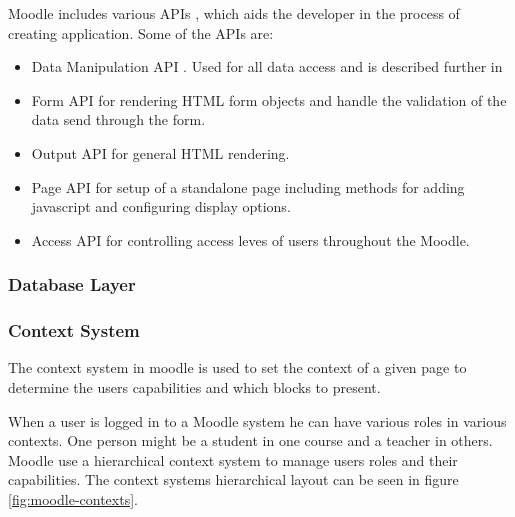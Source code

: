  Moodle includes various APIs \cite{moodlecoreapis}, which aids the developer in the process of creating application. Some of the APIs are:
	
	\begin{itemize}
		\item Data Manipulation API \cite{moodledml}. Used for all data access and is described further in 
		\item Form API \cite{moodleformapi} for rendering HTML form objects and handle the validation of the data send through the form. 
		\item Output API \cite{moodleoutputapi} for general HTML rendering.
		\item Page API \cite{moodlepageapi} for setup of a standalone page including methods for adding javascript and configuring display options. 
		\item Access API \cite{moodleaccessapi} for controlling access leves of users throughout the Moodle. 
	\end{itemize}
	
	
	\subsubsection{Database Layer}
	\label{sec:moodleoplatformdbml}
	
	
	
	
	\subsubsection{Context System}
The context system in moodle is used to set the context of a given page to determine the users capabilities and which blocks to present.
 
When a user is logged in to a Moodle system he can have various roles in various contexts. 
One person might be a student in one course and a teacher in others. 
Moodle use a hierarchical context system to manage users roles and their capabilities. 
The context systems hierarchical layout can be seen in figure \ref{fig:moodle-contexts}.
 
